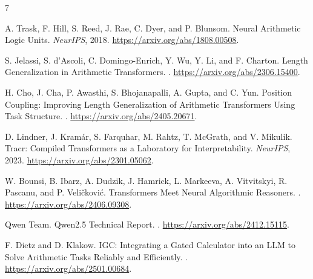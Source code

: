 \documentclass[11pt]{article}
\begin{document}
\begin{thebibliography}{7}

A. Trask, F. Hill, S. Reed, J. Rae, C. Dyer, and P. Blunsom.
\newblock Neural Arithmetic Logic Units.
\newblock \emph{NeurIPS}, 2018.
\newblock \url{https://arxiv.org/abs/1808.00508}.

S. Jelassi, S. d'Ascoli, C. Domingo-Enrich, Y. Wu, Y. Li, and F. Charton.
\newblock Length Generalization in Arithmetic Transformers.
.
\newblock \url{https://arxiv.org/abs/2306.15400}.

H. Cho, J. Cha, P. Awasthi, S. Bhojanapalli, A. Gupta, and C. Yun.
\newblock Position Coupling: Improving Length Generalization of Arithmetic
Transformers Using Task Structure.
.
\newblock \url{https://arxiv.org/abs/2405.20671}.

D. Lindner, J. Kram\'{a}r, S. Farquhar, M. Rahtz, T. McGrath, and V. Mikulik.
\newblock Tracr: Compiled Transformers as a Laboratory for Interpretability.
\newblock \emph{NeurIPS}, 2023.
\newblock \url{https://arxiv.org/abs/2301.05062}.

W. Bounsi, B. Ibarz, A. Dudzik, J. Hamrick, L. Markeeva, A. Vitvitskyi,
R. Pascanu, and P. Veli\v{c}kovi\'{c}.
\newblock Transformers Meet Neural Algorithmic Reasoners.
.
\newblock \url{https://arxiv.org/abs/2406.09308}.

Qwen Team.
\newblock Qwen2.5 Technical Report.
.
\newblock \url{https://arxiv.org/abs/2412.15115}.

F. Dietz and D. Klakow.
\newblock IGC: Integrating a Gated Calculator into an LLM to Solve Arithmetic
Tasks Reliably and Efficiently.
.
\newblock \url{https://arxiv.org/abs/2501.00684}.

\end{thebibliography}
\end{document}
